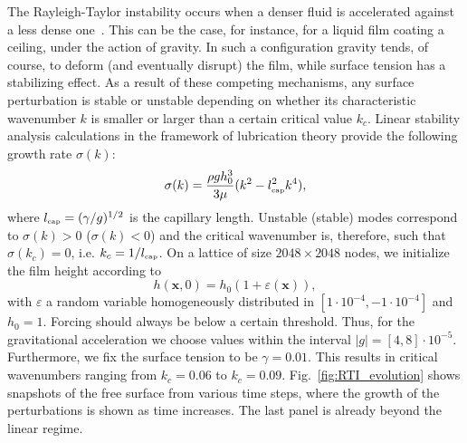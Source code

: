 The Rayleigh-Taylor instability occurs when a denser fluid is accelerated against a less dense one~\cite{rayleighInvestigationCharacterEquilibrium1882,taylorInstabilityLiquidSurfaces1997,kullTheoryRayleighTaylorInstability1991,sharpOverviewRayleighTaylorInstability1984}. 
This can be the case, for instance, for a liquid film coating a ceiling, under the action of gravity. 
In such a configuration gravity tends, of course, to deform (and eventually disrupt) the film, while surface tension has a stabilizing effect.
As a result of these competing mechanisms, any surface perturbation is stable or unstable depending on whether its characteristic wavenumber $k$ is smaller or larger than a certain critical value $k_c$. 
Linear stability analysis calculations in the framework of lubrication theory provide the following growth rate $\sigma(k)$:
\begin{equation}\label{eq:RTgrowth}
    \sigma(k) = \frac{\rho g h_0^3}{3\mu}(k^2 - l_{\mbox{\tiny{cap}}}^2 k^4),
\end{equation}
where $l_{\mbox{\tiny{cap}}} = (\gamma/g)^{1/2}$ is the capillary length. 
Unstable (stable) modes correspond to $\sigma(k)>0$ ($\sigma(k)<0$) and the critical wavenumber is, therefore, such that $\sigma(k_c)=0$, i.e. $k_c = 1/l_{\mbox{\tiny{cap}}}$.
On a lattice of size $2048 \times 2048$ nodes, we initialize the film height according to
\begin{equation}
  h(\mathbf{x},0) = h_0(1 + \varepsilon(\mathbf{x})),
\end{equation}
with $\varepsilon$ a random variable homogeneously distributed in $[1\cdot 10^{-4},-1\cdot 10^{-4}]$ and $h_0 = 1$. 
Forcing should always be below a certain threshold. Thus, for the gravitational acceleration we choose values within the interval $|g| = [4,8]\cdot 10^{-5}$. Furthermore, we fix the surface tension to be $\gamma=0.01$. 
This results in critical wavenumbers ranging from $k_c= 0.06$ to $k_c = 0.09$.
Fig.~\ref{fig:RTI_evolution} shows snapshots of the free surface from various time steps, where the growth of the perturbations is shown as time increases. The last panel is already beyond the linear regime.

